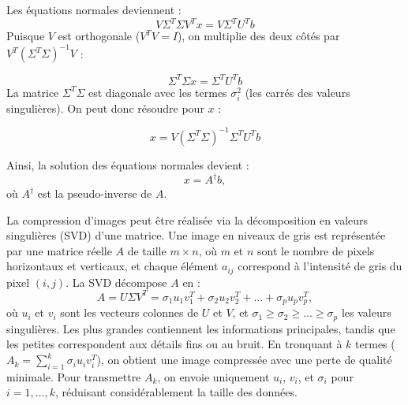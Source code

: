 \documentclass[french, 10pt]{beamer}
\theoremstyle{definition}
\begin{document}
\begin{frame}
	Les équations normales deviennent :
	\[
	V \Sigma^T \Sigma V^T x = V \Sigma^T U^T b
	\]
	Puisque \( V \) est orthogonale (\( V^T V = I \)), on multiplie des deux côtés par \( V^T (\Sigma^T \Sigma)^{-1} V \) :
	
	\[
	\Sigma^T \Sigma x = \Sigma^T U^T b
	\]
	La matrice \( \Sigma^T \Sigma \) est diagonale avec les termes \( \sigma_i^2 \) (les carrés des valeurs singulières). On peut donc résoudre pour \( x \) :
	
	\[
	x = V (\Sigma^T \Sigma)^{-1} \Sigma^T U^T b
	\]
	
	Ainsi, la solution des équations normales devient :
	\[
	x = A^{\dagger} b,
	\]
	où \( A^{\dagger} \) est la pseudo-inverse  de \( A \).
\end{frame}


\begin{frame}
	La compression d'images peut être réalisée via la décomposition en valeurs singulières (SVD) d'une matrice. Une image en niveaux de gris est représentée par une matrice réelle \( A \) de taille \( m \times n \), où \( m \) et \( n \) sont le nombre de pixels horizontaux et verticaux, et chaque élément \( a_{ij} \) correspond à l'intensité de gris du pixel \( (i,j) \). La SVD décompose \( A \) en :
	\[
	A = U \Sigma V^T = \sigma_1 u_1 v_1^T + \sigma_2 u_2 v_2^T + \dots + \sigma_p u_p v_p^T,
	\]
	où \( u_i \) et \( v_i \) sont les vecteurs colonnes de \( U \) et \( V \), et \( \sigma_1 \geq \sigma_2 \geq \dots \geq \sigma_p \) les valeurs singulières. Les plus grandes contiennent les informations principales, tandis que les petites correspondent aux détails fins ou au bruit. En tronquant à \( k \) termes (\( A_k = \sum_{i=1}^k \sigma_i u_i v_i^T \)), on obtient une image compressée avec une perte de qualité minimale. Pour transmettre \( A_k \), on envoie uniquement \( u_i \), \( v_i \), et \( \sigma_i \) pour \( i = 1, \dots, k \), réduisant considérablement la taille des données.
\end{frame}
\end{document}
